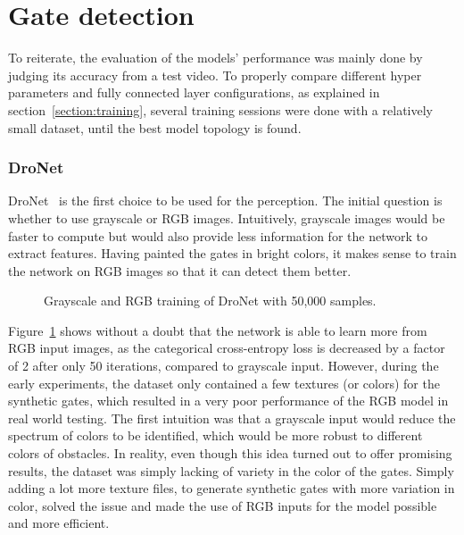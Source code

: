 \section{Gate detection}

To reiterate, the evaluation of the models' performance was mainly done by
judging its accuracy from a test video. To properly compare different
hyper parameters and fully connected layer configurations, as explained in
section~\ref{section:training}, several training sessions were done with a
relatively small dataset, until the best model topology is found.

\subsubsection{DroNet}

DroNet~\cite{dronet} is the first choice to be used for the perception. The
initial question is whether to use grayscale or RGB images. Intuitively,
grayscale images would be faster to compute but would also provide less
information for the network to extract features. Having painted the gates in
bright colors, it makes sense to train the network on RGB images so that it can
detect them better.

\begin{figure}[h]
	\centering
	
	\caption{Grayscale and RGB training of DroNet with 50,000 samples.}
	\label{plot:grayscale-vs-rgb-dronet}
\end{figure}

Figure~\ref{plot:grayscale-vs-rgb-dronet} shows without a doubt that the
network is able to learn more from RGB input images, as the categorical
cross-entropy loss is decreased by a factor of 2 after only 50 iterations,
compared to grayscale input. However, during the early experiments, the dataset
only contained a few textures (or colors) for the synthetic gates, which
resulted in a very poor performance of the RGB model in real world testing. The
first intuition was that a grayscale input would reduce the spectrum of colors
to be identified, which would be more robust to different colors of obstacles.
In reality, even though this idea turned out to offer promising results, the
dataset was simply lacking of variety in the color of the gates. Simply adding
a lot more texture files, to generate synthetic gates with more variation in
color, solved the issue and made the use of RGB inputs for the model possible
and more efficient.\\

